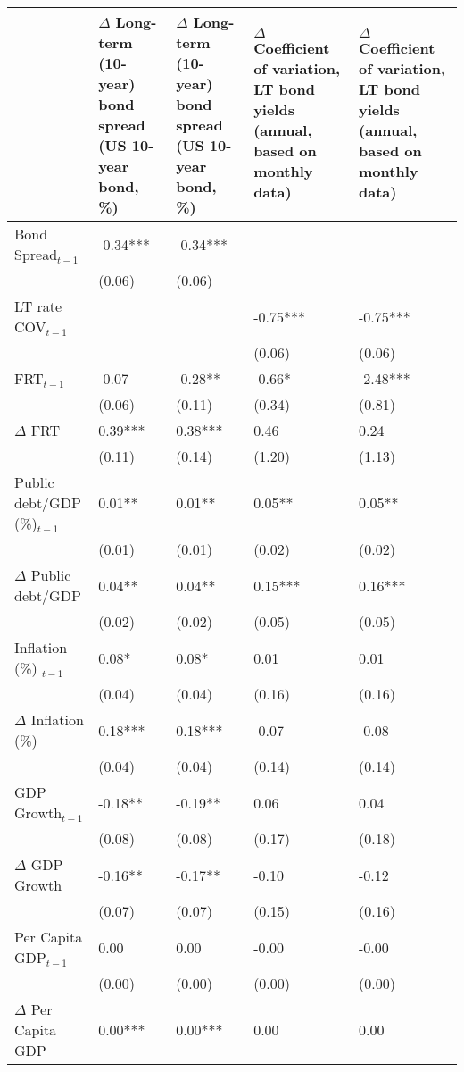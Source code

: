 \begingroup\tiny
\begin{tabular}{lp{3cm}p{3cm}p{3cm}p{3cm}}
  \hline
 & $\Delta$ Long-term (10-year) bond spread (US 10-year bond, \%) & $\Delta$ Long-term (10-year) bond spread (US 10-year bond, \%) & $\Delta$ Coefficient of variation, LT bond yields (annual, based on monthly data) & $\Delta$ Coefficient of variation, LT bond yields (annual, based on monthly data) \\ 
  \hline
Bond Spread$_{t-1}$ & -0.34*** & -0.34*** &  &  \\ 
   & (0.06) & (0.06) &  &  \\ 
  LT rate COV$_{t-1}$ &  &  & -0.75*** & -0.75*** \\ 
   &  &  & (0.06) & (0.06) \\ 
  FRT$_{t-1}$ & -0.07 & -0.28** & -0.66* & -2.48*** \\ 
   & (0.06) & (0.11) & (0.34) & (0.81) \\ 
  $\Delta$ FRT & 0.39*** & 0.38*** & 0.46 & 0.24 \\ 
   & (0.11) & (0.14) & (1.20) & (1.13) \\ 
  Public debt/GDP (\%)$_{t-1}$ & 0.01** & 0.01** & 0.05** & 0.05** \\ 
   & (0.01) & (0.01) & (0.02) & (0.02) \\ 
  $\Delta$ Public debt/GDP & 0.04** & 0.04** & 0.15*** & 0.16*** \\ 
   & (0.02) & (0.02) & (0.05) & (0.05) \\ 
  Inflation (\%) $_{t-1}$ & 0.08* & 0.08* & 0.01 & 0.01 \\ 
   & (0.04) & (0.04) & (0.16) & (0.16) \\ 
  $\Delta$ Inflation (\%) & 0.18*** & 0.18*** & -0.07 & -0.08 \\ 
   & (0.04) & (0.04) & (0.14) & (0.14) \\ 
  GDP Growth$_{t-1}$ & -0.18** & -0.19** & 0.06 & 0.04 \\ 
   & (0.08) & (0.08) & (0.17) & (0.18) \\ 
  $\Delta$ GDP Growth & -0.16** & -0.17** & -0.10 & -0.12 \\ 
   & (0.07) & (0.07) & (0.15) & (0.16) \\ 
  Per Capita GDP$_{t-1}$ & 0.00 & 0.00 & -0.00 & -0.00 \\ 
   & (0.00) & (0.00) & (0.00) & (0.00) \\ 
  $\Delta$ Per Capita GDP & 0.00*** & 0.00*** & 0.00 & 0.00 \\ 

\end{tabular}
